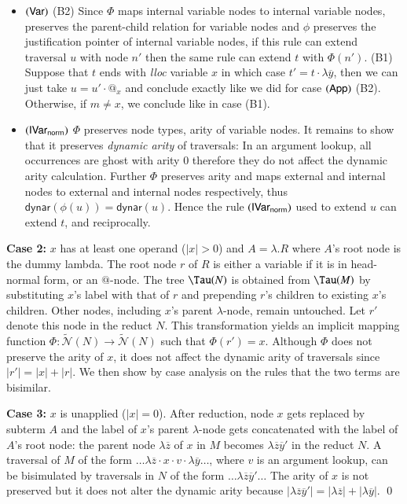 \documentclass{elsarticle}
\def\endproofatend{\end{proof}}
\theoremstyle{plain}
\theoremstyle{definition}
\newcommand\Nodes{\mathcal{N}}%
\newcommand\ExtendedNodes{\tilde{\Nodes}}
\newcommand{\normalizing}{{\sf norm}}
\newcommand{\ctree}{\Tau} %
\newcommand\dynar{\textsf{dynar}} %
\begin{document}
\begin{itemize}[itemindent=0.1em, leftmargin=0.4em]
    \item $\mathbf{({\sf Var})}$
    (B2) Since $\Phi$ maps internal variable nodes to internal
    variable nodes, preserves the parent-child relation for variable nodes and $\phi$ preserves the justification pointer of internal variable nodes, if this rule can extend traversal $u$ with node $n'$ then the same rule can extend $t$ with $\Phi(n')$.
%
    (B1) Suppose that $t$ ends with \emph{lloc} variable $x$ in which case $t' = t \cdot \lambda\overline{y}$, then
        we can just take $u = u' \cdot @_x$ and conclude exactly like we did for case $\mathbf{({\sf App})}$ (B2).
    Otherwise, if $m\neq x$, we conclude like in case (B1).

    \item $\rulename{IVar_\normalizing}$ $\Phi$ preserves node types, arity of variable nodes. It remains to show that it preserves \emph{dynamic arity} of traversals: In an argument lookup, all occurrences are ghost with arity $0$ therefore they do not affect the dynamic arity calculation.
    Further $\Phi$ preserves arity and maps external and internal nodes to external and internal nodes respectively, thus $\dynar(\phi(u))=\dynar(u)$.
    Hence the rule $\rulename{IVar_\normalizing}$ used to extend $u$ can extend $t$, and reciprocally.
\end{itemize}
\fi

{\bf Case 2:} $x$ has at least one operand ($|x|>0$) and $A = \lambda. R$ where $A$'s root node is the dummy lambda.
The root node $r$ of $R$ is either a variable if it is in head-normal form, or an $@$-node.
The tree $\ctree(N)$ is obtained from $\ctree(M)$
by substituting $x$'s label with that of $r$ and prepending $r$'s children to existing $x$'s children. Other nodes, including $x$'s parent $\lambda$-node, remain untouched. Let $r'$ denote this node in the reduct $N$.
This transformation yields an implicit mapping function $\Phi : \ExtendedNodes(N)\rightarrow \ExtendedNodes(N)$ such that $\Phi(r') = x$.
Although $\Phi$ does not preserve the arity of $x$, it does not affect the dynamic arity of traversals since $|r'| = |x| + |r|$.
We then show by case analysis on the rules that the two terms are bisimilar.

{\bf Case 3:} $x$ is unapplied ($|x|=0$).
%
After reduction, node $x$ gets replaced by subterm $A$ and the label of $x$'s parent $\lambda$-node gets concatenated with the label of $A$'s root node:
the parent node $\lambda\overline{z}$ of $x$ in $M$ becomes $\lambda\overline{z}\overline{y}'$ in the reduct $N$.
A traversal of $M$ of the form $\ldots \lambda\overline{z} \cdot x \cdot v \cdot \lambda\overline{y} \ldots$, where $v$ is an argument lookup, can be bisimulated by traversals in $N$ of the form $\ldots \lambda\overline{z}\overline{y}' \ldots$ The arity of $x$ is not preserved but it does not alter the dynamic arity because $|\lambda{\overline{z} \overline{y}'}| =
 |\lambda{\overline{z}}| +  |\lambda{\overline{y}}|$.
\qed
\end{document}
